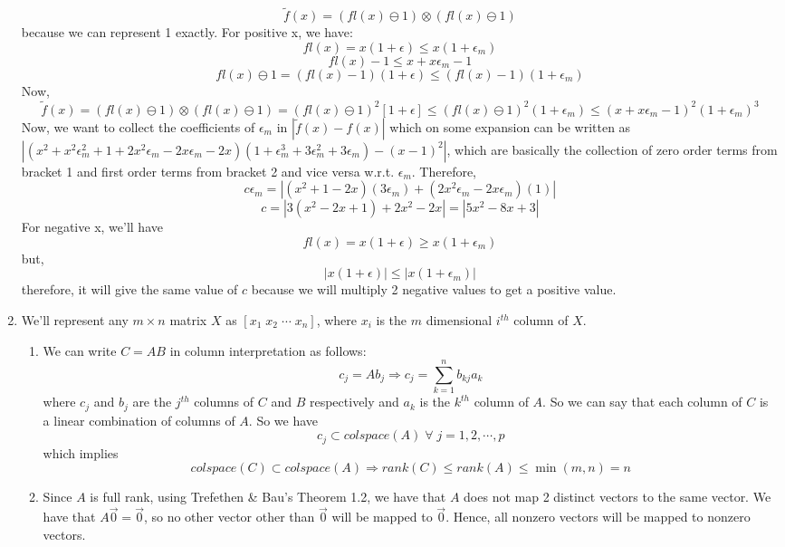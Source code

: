 \documentclass{article}
\begin{document}
\begin{enumerate}
    $$\widetilde{f}(x) = (fl(x) \ominus 1) \otimes (fl(x) \ominus 1)$$
    because we can represent 1 exactly.
    For positive x, we have:
    $$fl(x) = x(1 + \epsilon) \leq x(1 + \epsilon_m)$$
    $$fl(x) - 1 \leq x + x\epsilon_m - 1$$
    $$fl(x) \ominus 1 = (fl(x) - 1)(1 + \epsilon) \leq (fl(x) - 1)(1 + \epsilon_m)$$
    Now,
    $$\widetilde{f}(x) = (fl(x) \ominus 1) \otimes (fl(x) \ominus 1) = (fl(x) \ominus 1)^2[1 + \epsilon] \leq (fl(x) \ominus 1)^2(1 + \epsilon_m) \leq (x + x\epsilon_m - 1)^2(1 + \epsilon_m)^3$$
    Now, we want to collect the coefficients of $\epsilon_m$ in $|\widetilde{f}(x) - f(x)|$ which on some expansion can be written as $|(x^2 + x^2\epsilon_m^2 + 1 + 2x^2\epsilon_m - 2x\epsilon_m - 2x)(1 + \epsilon_m^3 + 3\epsilon_m^2 + 3\epsilon_m) - (x - 1)^2|$, which are basically the collection of zero order terms from bracket 1 and first order terms from bracket 2 and vice versa w.r.t. $\epsilon_m$. Therefore,
    $$c\epsilon_m = |(x^2 + 1 - 2x)(3\epsilon_m) + (2x^2\epsilon_m - 2x\epsilon_m)(1)|$$
    $$c = |3(x^2 - 2x + 1) + 2x^2 - 2x| = |5x^2 - 8x + 3|$$
    For negative x, we'll have
    $$fl(x) = x(1 + \epsilon) \geq x(1 + \epsilon_m)$$
    but,
    $$|x(1 + \epsilon)| \leq |x(1 + \epsilon_m)|$$
    therefore, it will give the same value of $c$ because we will multiply 2 negative values to get a positive value.
    \clearpage
    \item We'll represent any $m \times n$ matrix $X$ as $[x_1\; x_2\; \cdots \; x_n]$, where $x_i$ is the $m$ dimensional $i^{th}$ column of $X$.
    \begin{enumerate}[label=(\alph*)]
        \item We can write $C = AB$ in column interpretation as follows:
        $$c_j = Ab_j \Rightarrow c_j = \sum\limits_{k = 1}^n b_{kj}a_k$$
        where $c_j$ and $b_j$ are the $j^{th}$ columns of $C$ and $B$ respectively and $a_k$ is the $k^{th}$ column of $A$. So we can say that each column of $C$ is a linear combination of columns of $A$. So we have
        $$c_j \subset colspace(A) \; \forall \; j = 1,2,\cdots,p$$
        which implies
        $$colspace(C) \subset colspace(A) \Rightarrow rank(C) \leq rank(A) \leq \min(m, n) = n$$
        \item Since $A$ is full rank, using Trefethen \& Bau's Theorem 1.2, we have that $A$ does not map 2 distinct vectors to the same vector. We have that $A\vec{0} = \vec{0}$, so no other vector other than $\vec{0}$ will be mapped to $\vec{0}$. Hence, all nonzero vectors will be mapped to nonzero vectors.\\

\end{enumerate}
\end{enumerate}
\end{document}
